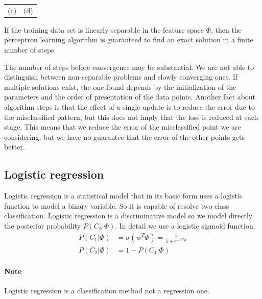 \documentclass[../main.tex]{subfiles}
\begin{document}
\begin{center}
\begin{tabular}{cc}
        (c)                                                      & (d)                                                      \\[6pt]
    \end{tabular}
\end{center}

\begin{theorem}
    If the training data set is linearly separable in the feature space $\Phi$, then the perceptron learning algorithm is guaranteed to find an exact solution in a finite number of steps
\end{theorem}
The number of steps before convergence may be substantial. We are not able to distinguish between non-separable problems and slowly converging ones. If multiple solutions exist, the one found depends by the initialization of the parameters and the order of presentation of the data points.
Another fact about algorithm steps is that the effect of a single update is to reduce the error due to the misclassified pattern, but this does not imply that the loss is reduced at each stage. This means that we reduce the error of the misclassified point we are considering, but we have no guarantee that the error of the other points gets better.

\newpage
\subsection{Logistic regression}
Logistic regression is a statistical model that in its basic form uses a logistic function to model a binary variable. So it is capable of resolve two-class classification.
Logistic regression is a discriminative model so we model directly the posterior probability $P(C_k|\Phi)$. In detail we use a logistic sigmoid function\footnotemark.
\begin{align}
    P(C_1|\Phi) & = \sigma(w^T \Phi) = \frac{1}{1+e^{-w^T\Phi}} \\
    P(C_2|\Phi) & = 1- P(C_1|\Phi)
\end{align}

\paragraph{Note} Logistic regression is a classification method not a regression one.
\end{document}

